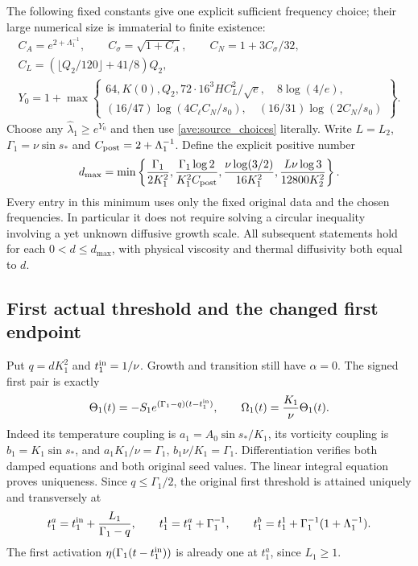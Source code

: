 The following fixed constants give one explicit sufficient frequency
choice; their large numerical size is immaterial to finite existence:
\begin{equation}\label{ave:Ychoice}
\begin{gathered}
 C_A=e^{2+\Lambda_1^{-1}},\qquad
 C_\sigma=\sqrt{1+C_A},\qquad C_N=1+3C_\sigma/32,\\
 C_L=(\lfloor Q_2/120\rfloor+41/8)Q_2,\\
 Y_0=1+\max\left\{
 \begin{gathered}
 64,K(0),Q_2,72\cdot16^3HC_L^2/\sqrt e,\quad8\log(4/e),\\
 (16/47)\log(4C_\ell C_N/s_0),\quad
 (16/31)\log(2C_N/s_0)
 \end{gathered}\right\}.
\end{gathered}
\end{equation}
Choose any $\widehat\lambda_1\geq e^{Y_0}$ and then use
\eqref{ave:source_choices} literally. Write $L=L_2$,
$\Gamma_1=\nu\sin s_*$ and $C_{\rm post}=2+\Lambda_1^{-1}$.
Define the explicit positive number
\begin{equation}\label{ave:dmax}
 d_{\max}=\min\left\{
 \frac{\Gamma_1}{2K_1^2},
 \frac{\Gamma_1\log2}{K_1^2C_{\rm post}},
 \frac{\nu\log(3/2)}{16K_1^2},
 \frac{L\nu\log3}{12800K_2^2}\right\}.
\end{equation}
Every entry in this minimum uses only the fixed original data and
the chosen frequencies. In particular it does not require solving
a circular inequality involving a yet unknown diffusive growth scale.
All subsequent statements hold for each $0<d\leq d_{\max}$, with
physical viscosity and thermal diffusivity both equal to $d$.

\subsection{First actual threshold and the changed first endpoint}

Put $q=dK_1^2$ and $t_1^{\rm in}=1/\nu$.
Growth and transition still have $\alpha=0$. The signed first pair is
exactly
\begin{equation}\label{ave:first_growth}
 \Theta_1(t)=-S_1e^{(\Gamma_1-q)(t-t_1^{\rm in})},\qquad
 \Omega_1(t)=\frac{K_1}{\nu}\Theta_1(t).
\end{equation}
Indeed its temperature coupling is $a_1=A_0\sin s_*/K_1$,
its vorticity coupling is $b_1=K_1\sin s_*$, and
$a_1K_1/\nu=\Gamma_1$, $b_1\nu/K_1=\Gamma_1$.
Differentiation verifies both damped equations and both original
seed values. The linear integral equation proves uniqueness.
Since $q\leq\Gamma_1/2$, the original first threshold is attained
uniquely and transversely at
\begin{equation}\label{ave:first_times}
 t_1^a=t_1^{\rm in}+\frac{L_1}{\Gamma_1-q},\qquad
 t_1^1=t_1^a+\Gamma_1^{-1},\qquad
 t_1^b=t_1^1+\Gamma_1^{-1}(1+\Lambda_1^{-1}).
\end{equation}
The first activation $\eta(\Gamma_1(t-t_1^{\rm in}))$ is already one
at $t_1^a$, since $L_1\geq1$.


